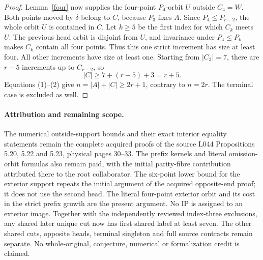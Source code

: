 \documentclass[11pt,a4paper]{article}
\begin{document}
\begin{proof}
Lemma~\ref{four} now supplies the four-point $P_4$-orbit $U$
outside $C_4=W$. Both points moved by $\delta$ belong to
$C$, because $P_3$ fixes $A$. Since $P_4\leq P_{r-2}$,
the whole orbit $U$ is contained in $C$.
Let $k\geq5$ be the first index for which $C_k$ meets $U$.
The previous head orbit is disjoint from $U$, and invariance
under $P_4\leq P_k$ makes $C_k$ contain all four points.
Thus this one strict increment has size at least four.
All other increments have size at least one. Starting from
$|C_3|=7$, there are $r-5$ increments up to $C_{r-2}$,
so
\[
                          |C|\geq7+(r-5)+3=r+5.        \tag{2}
\]
Equations (1)--(2) give $n=|A|+|C|\geq2r+1$, contrary
to $n=2r$. The terminal case is excluded as well.
\end{proof}

\paragraph{Attribution and remaining scope.}
The numerical outside-support bounds and their exact interior
equality statements remain the complete acquired proofs of the
source L044 Propositions 5.20, 5.22 and 5.23, physical pages
30--33. The prefix kernels and literal omission-orbit formulas
also remain paid, with the initial parity-fibre contribution
attributed there to the root collaborator. The six-point lower
bound for the exterior support repeats the initial argument of the
acquired opposite-end proof; it does not use the second head.
The literal four-point exterior orbit and its cost in the strict
prefix growth are the present
argument. No IP is assigned to an exterior image.
Together with the independently reviewed index-three exclusions,
any shared later unique cut now has first shared label at least
seven. The other shared cuts, opposite heads, terminal singleton
and full source contracts remain separate. No whole-original,
conjecture, numerical or formalization credit is claimed.
\end{document}
